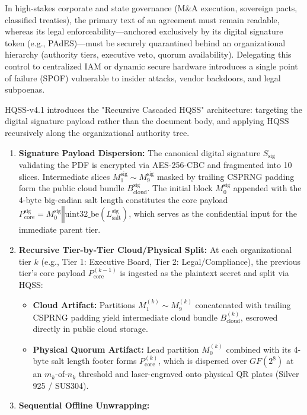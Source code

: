 \documentclass[11pt,a4paper,titlepage]{article}
\begin{document}
\else
In high-stakes corporate and state governance (M\&A execution, sovereign pacts, classified treaties), the primary text of an agreement must remain readable, whereas its legal enforceability—anchored exclusively by its digital signature token (e.g., PAdES)—must be securely quarantined behind an organizational hierarchy (authority tiers, executive veto, quorum availability). Delegating this control to centralized IAM or dynamic secure hardware introduces a single point of failure (SPOF) vulnerable to insider attacks, vendor backdoors, and legal subpoenas.

HQSS-v4.1 introduces the "Recursive Cascaded HQSS" architecture: targeting the digital signature payload rather than the document body, and applying HQSS recursively along the organizational authority tree.

\begin{enumerate}
  \item \textbf{Signature Payload Dispersion:}
    The canonical digital signature $S_{\text{sig}}$ validating the PDF is encrypted via AES-256-CBC and fragmented into 10 slices. Intermediate slices $M_1^{\text{sig}} \sim M_9^{\text{sig}}$ masked by trailing CSPRNG padding form the public cloud bundle $B_{\text{cloud}}^{\text{sig}}$. The initial block $M_0^{\text{sig}}$ appended with the 4-byte big-endian salt length constitutes the core payload $P_{\text{core}}^{\text{sig}} = M_0^{\text{sig}} \mathbin{\Vert} \text{uint32\_be}(L_{\text{salt}}^{\text{sig}})$, which serves as the confidential input for the immediate parent tier.
  \item \textbf{Recursive Tier-by-Tier Cloud/Physical Split:}
    At each organizational tier $k$ (e.g., Tier 1: Executive Board, Tier 2: Legal/Compliance), the previous tier's core payload $P_{\text{core}}^{(k-1)}$ is ingested as the plaintext secret and split via HQSS:
    \begin{itemize}
      \item \textbf{Cloud Artifact:} Partitions $M_1^{(k)} \sim M_9^{(k)}$ concatenated with trailing CSPRNG padding yield intermediate cloud bundle $B_{\text{cloud}}^{(k)}$, escrowed directly in public cloud storage.
      \item \textbf{Physical Quorum Artifact:} Lead partition $M_0^{(k)}$ combined with its 4-byte salt length footer forms $P_{\text{core}}^{(k)}$, which is dispersed over $GF(2^8)$ at an $m_k$-of-$n_k$ threshold and laser-engraved onto physical QR plates (Silver 925 / SUS304).
    \end{itemize}
  \item \textbf{Sequential Offline Unwrapping:}

\end{enumerate}
\end{document}
